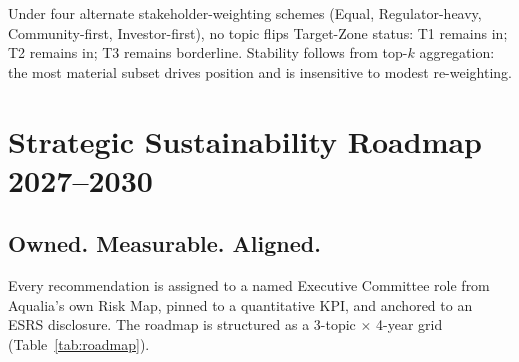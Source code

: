 \documentclass[11pt, a4paper]{article}
\begin{document}
Under four alternate stakeholder-weighting schemes (Equal, Regulator-heavy, Community-first, Investor-first), no topic flips Target-Zone status: T1 remains in; T2 remains in; T3 remains borderline. Stability follows from top-$k$ aggregation: the most material subset drives position and is insensitive to modest re-weighting.

\section{Strategic Sustainability Roadmap 2027--2030}
\label{sec:roadmap}

\subsection{Owned. Measurable. Aligned.}

Every recommendation is assigned to a named Executive Committee role from Aqualia's own Risk Map, pinned to a quantitative KPI, and anchored to an ESRS disclosure. The roadmap is structured as a 3-topic $\times$ 4-year grid (Table~\ref{tab:roadmap}).
\end{document}
